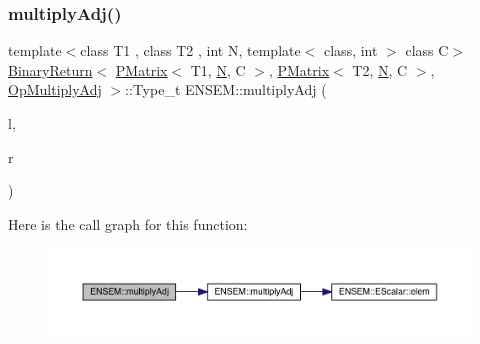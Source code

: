 \subsubsection{\texorpdfstring{multiplyAdj()}{multiplyAdj()}\hspace{0.1cm}{\footnotesize\ttfamily [3/3]}}
{\footnotesize\ttfamily template$<$class T1 , class T2 , int N, template$<$ class, int $>$ class C$>$ \\
\mbox{\hyperlink{structENSEM_1_1BinaryReturn}{Binary\+Return}}$<$ \mbox{\hyperlink{classENSEM_1_1PMatrix}{P\+Matrix}}$<$ T1, \mbox{\hyperlink{operator__name__util_8cc_a7722c8ecbb62d99aee7ce68b1752f337}{N}}, C $>$, \mbox{\hyperlink{classENSEM_1_1PMatrix}{P\+Matrix}}$<$ T2, \mbox{\hyperlink{operator__name__util_8cc_a7722c8ecbb62d99aee7ce68b1752f337}{N}}, C $>$, \mbox{\hyperlink{structENSEM_1_1OpMultiplyAdj}{Op\+Multiply\+Adj}} $>$\+::Type\+\_\+t E\+N\+S\+E\+M\+::multiply\+Adj (\begin{DoxyParamCaption}\item[{const \mbox{\hyperlink{classENSEM_1_1PMatrix}{P\+Matrix}}$<$ T1, \mbox{\hyperlink{operator__name__util_8cc_a7722c8ecbb62d99aee7ce68b1752f337}{N}}, C $>$ \&}]{l,  }\item[{const \mbox{\hyperlink{classENSEM_1_1PMatrix}{P\+Matrix}}$<$ T2, \mbox{\hyperlink{operator__name__util_8cc_a7722c8ecbb62d99aee7ce68b1752f337}{N}}, C $>$ \&}]{r }\end{DoxyParamCaption})\hspace{0.3cm}{\ttfamily [inline]}}

Here is the call graph for this function\+:\nopagebreak
\begin{figure}[H]
\begin{center}
\leavevmode
\includegraphics[width=350pt]{df/d0a/group__primmatrix_gaf37104443218a1cbaa8ab848065a0a09_cgraph}
\end{center}
\end{figure}
\mbox{\label{group__primmatrix_ga9edd8305793268c1fbc1b874baa000d3}} 
